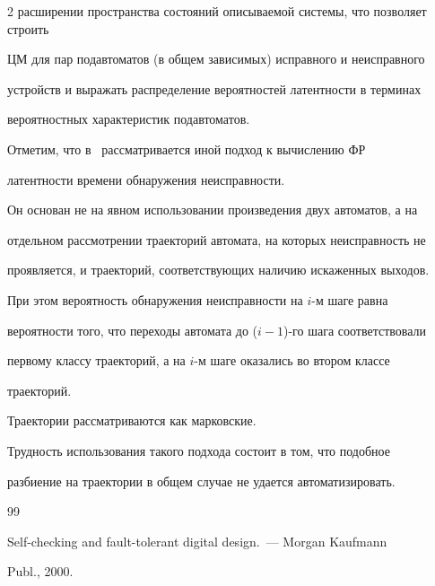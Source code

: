 \begin{multicols}{2}
расширении пространства состояний описываемой системы, что позволяет строить


ЦМ для пар подавтоматов (в общем зависимых) исправного и неисправного


устройств и выражать распределение вероятностей латентности в терминах


вероятностных характеристик подавтоматов.





 Отметим, что в~\cite{7} рассматривается иной подход к вычислению ФР


латентности времени обнаружения неисправности.


Он основан не на явном использовании произведения двух автоматов, а на


отдельном рассмотрении траекторий автомата, на которых неисправность не


проявляется, и траекторий, соответствующих наличию искаженных выходов.


При этом вероятность обнаружения неисправности на $i$-м шаге равна


вероятности того, что переходы автомата до ($i-1$)-го шага соответствовали


первому классу траекторий, а на $i$-м шаге оказались во втором классе


траекторий.


Траектории рас\-смат\-ри\-ва\-ют\-ся как марковские.


Трудность использования такого подхода состоит в том, что подобное


разбиение на траектории в общем случае не удается автоматизировать.





\vspace*{-6pt}





{\small\frenchspacing


{\baselineskip=10.6pt




\begin{thebibliography}{99}






Self-checking and fault-tolerant digital design.~--- Morgan Kaufmann


Publ., 2000.






\end{thebibliography}}}
\end{multicols}
